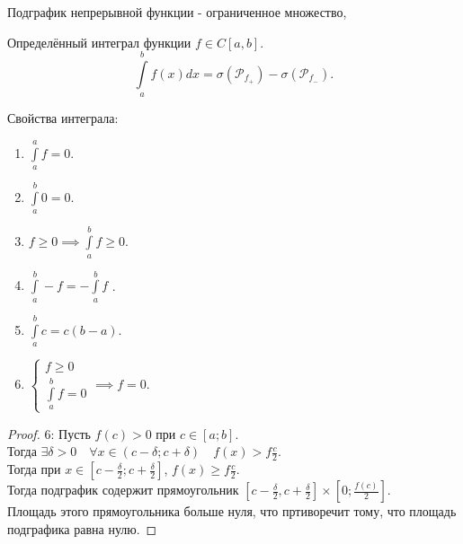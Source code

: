 \documentclass[11pt, oneside]{article}   	%
\begin{document}
    \begin{dlemma}
        Подграфик непрерывной функции - ограниченное множество,
    \end{dlemma}
    \begin{definition}
        Определённый интеграл функции $f\in C\left[a, b\right]$.\\
        \[ \int\limits_{a}^{b} f(x)dx = \sigma(\mathcal{P}_{f_+}) - \sigma(\mathcal{P}_{f_-})  .\] 
    \end{definition}
    \begin{dlemma} Свойства интеграла:
        \begin{enumerate}
            \item $\int\limits_{a}^{a} f = 0$.
            \item $ \int\limits_{a}^{b} 0 = 0$.
            \item $f \ge 0 \implies \int\limits_{a}^{b} f \ge 0$.
            \item $\int\limits_{a}^{b} -f = -\int\limits_{a}^{b} f$   .
            \item $\int\limits_{a}^{b} c = c(b-a)$.
            \item $\begin{cases}
                f \ge 0\\
                \int\limits_{a}^{b} f = 0 
            \end{cases} \implies f = 0$.
        \end{enumerate}
        \begin{proof}
            $6$: Пусть $f(c) > 0$ при $c\in \left[a; b\right]$.\\
            Тогда $\exists{\delta > 0}\quad \forall{x\in (c-\delta; c+\delta)}\quad f(x)>f\frac{c}{2}$.\\
            Тогда при $x\in \left[c-\frac{\delta}{2}; c+\frac{\delta}{2}\right]$, $f(x) \ge f\frac{c}{2}$.\\
            Тогда подграфик содержит прямоугольник $\left[c-\frac{\delta}{2}, c+\frac{\delta}{2}\right] \times \left[0; \frac{f(c)}{2}\right]$.\\
            Площадь этого прямоугольника больше нуля, что пртиворечит тому, что площадь подграфика равна нулю.
        \end{proof}
    \end{dlemma}
\end{document}
